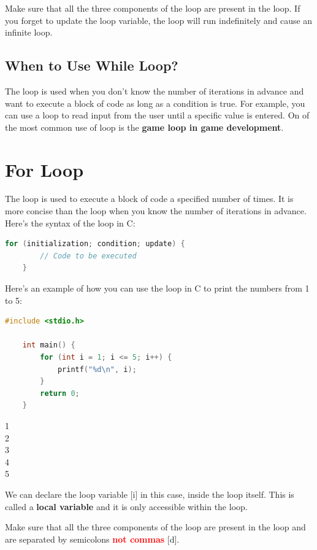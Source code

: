 \documentclass[12pt, openany]{book}
\begin{document}
\begin{warningbox}
    Make sure that all the three components of the loop are present in the  loop. If you forget to update the loop variable, the loop will run indefinitely and cause an infinite loop.
\end{warningbox}

\subsection{When to Use While Loop?}
The  loop is used when you don't know the number of iterations in advance and want to execute a block of code as long as a condition is true. For example, you can use a  loop to read input from the user until a specific value is entered. On of the most common use of  loop is the \textbf{game loop in game development}.

\section{For Loop}
The  loop is used to execute a block of code a specified number of times. It is more concise than the  loop when you know the number of iterations in advance. Here's the syntax of the  loop in C:
\begin{lstlisting}[language=C, gobble=0, caption=For Loop Syntax]
    for (initialization; condition; update) {
        // Code to be executed
    }
\end{lstlisting}

Here's an example of how you can use the  loop in C to print the numbers from 1 to 5:
\begin{lstlisting}[language=C, gobble=0, caption=Using For Loop in C]
    #include <stdio.h>
    
    int main() {
        for (int i = 1; i <= 5; i++) {
            printf("%d\n", i);
        }
        return 0;
    }
\end{lstlisting}
\begin{tcolorbox}[colback=lightgray!10, colframe=black, title=Output]
    1 \\
    2 \\
    3 \\
    4 \\
    5
\end{tcolorbox}
\begin{infobox}
    We can declare the loop variable [i] in this case, inside the  loop itself. This is called a \textbf{local variable} and it is only accessible within the loop.
\end{infobox}
\begin{warningbox}
    Make sure that all the three components of the loop are present in the  loop and are separated by semicolons \ui{;} \textbf{\textcolor{red}{not commas}} \ui{,}[d].
\end{warningbox}
\end{document}
